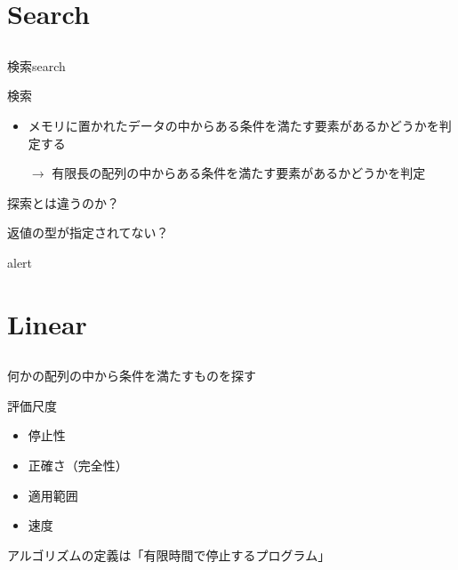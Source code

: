 \documentclass{beamer}
\begin{document}
\section{Search}		%
\subsection{}

\begin{frame}[fragile]{検索}{search}
\begin{block}{検索}
\begin{itemize}%
\item 
メモリに置かれたデータの中からある条件を満たす要素があるかどうかを判定する
\item[$\to$]
有限長の配列の中からある条件を満たす要素があるかどうかを判定
\end{itemize}
\end{block}
探索とは違うのか？

返値の型が指定されてない？
\begin{alertblock}{alert}
\end{alertblock}
\end{frame}

\section{Linear}		%
\subsection{}

\begin{frame}[fragile]{何かの配列の中から条件を満たすものを探す}{}
\end{frame}

\begin{frame}[fragile]{評価尺度}{}
\begin{itemize}%
\item 停止性
\item 正確さ（完全性）
\item 適用範囲
\item 速度
\end{itemize}

\vfill
アルゴリズムの定義は「有限時間で停止するプログラム」
\end{frame}
\end{document}

